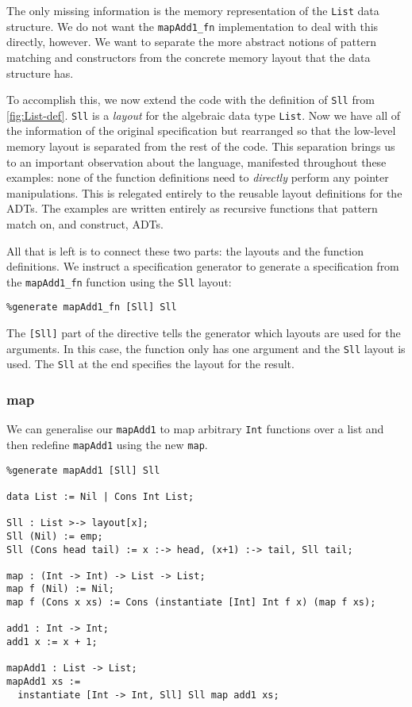 \noindent
The only missing information is the memory representation of the \verb|List| data structure. We do not want the
\verb|mapAdd1_fn| implementation to deal with this directly, however. We want to separate the more abstract notions
of pattern matching and constructors from the concrete memory layout that the data structure has.

To accomplish this, we now extend the code with the definition of
\verb|Sll| from \autoref{fig:List-def}. \verb|Sll| is a
\textit{layout} for the algebraic data type \verb|List|.
%
Now we have all of the information of the original specification but
rearranged so that the low-level memory layout is separated from the
rest of the code. This separation brings us to an important
observation about the language, manifested throughout these examples:
none of the function definitions need to \emph{directly} perform any
pointer manipulations. This is relegated entirely to the reusable
layout definitions for the ADTs. The examples are written entirely as
recursive functions that pattern match on, and construct, ADTs.

All that is left is to connect these two parts: the layouts and the
function definitions. We instruct a \SuSLik{} specification generator to
generate a \SuSLik{} specification from the \verb|mapAdd1_fn| function
using the \verb|Sll| layout:
%
\begin{lstlisting}
%generate mapAdd1_fn [Sll] Sll
\end{lstlisting}
%
The \verb|[Sll]| part of the directive tells the generator which
layouts are used for the arguments. In this case, the function only
has one argument and the \verb|Sll| layout is used. The \verb|Sll| at
the end specifies the layout for the result.

\subsubsection{map}

We can generalise our \verb|mapAdd1| to map arbitrary \verb|Int|
functions over a list and then redefine \verb|mapAdd1| using the new
\verb|map|.

\begin{lstlisting}
%generate mapAdd1 [Sll] Sll

data List := Nil | Cons Int List;

Sll : List >-> layout[x];
Sll (Nil) := emp;
Sll (Cons head tail) := x :-> head, (x+1) :-> tail, Sll tail;

map : (Int -> Int) -> List -> List;
map f (Nil) := Nil;
map f (Cons x xs) := Cons (instantiate [Int] Int f x) (map f xs);

add1 : Int -> Int;
add1 x := x + 1;

mapAdd1 : List -> List;
mapAdd1 xs :=
  instantiate [Int -> Int, Sll] Sll map add1 xs;
\end{lstlisting}

